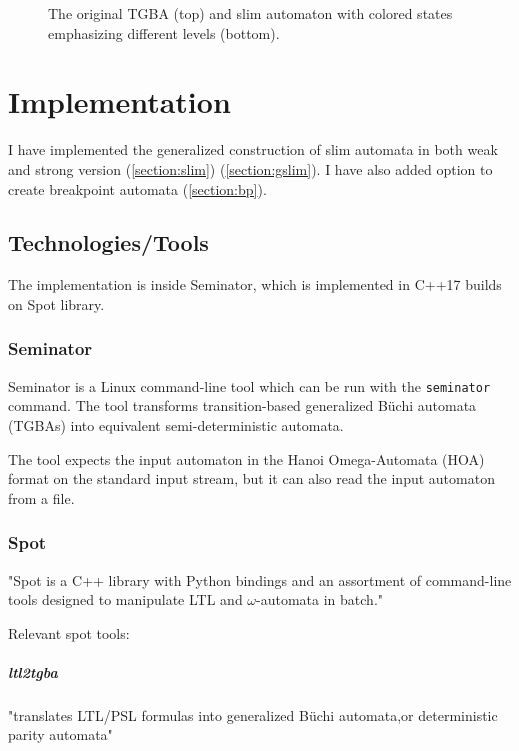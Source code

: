 \documentclass[
	digital,
nolof, nolot
]{fithesis3}
\begin{document}
						
			\begin{figure}[ht]
				\begin{center}
					
					
				\end{center}
				\caption{The original TGBA (top) and slim automaton with colored states emphasizing different levels (bottom).  }
				\label{fig:slim:gg}
			\end{figure}
			

			
	\chapter{Implementation} \label{implementation}
		I have implemented the generalized construction of slim automata in both weak and strong version  (\ref{section:slim}) (\ref{section:gslim}). I have also added option to create breakpoint automata (\ref{section:bp}).
		
		\section{Technologies/Tools}
		The implementation is inside Seminator, which is implemented in C++17 builds on Spot library. 
		\subsection{Seminator} 
		Seminator is a Linux command-line tool which can be run with the \texttt{seminator} command. The tool transforms transition-based generalized Büchi automata (TGBAs) into equivalent semi-deterministic automata. \cite{Klokočka2017thesis}\cite{seminator}\cite{seminator2}
		
		
		
		The tool expects the input automaton in the Hanoi Omega-Automata (HOA) format \cite{DBLP:conf/cav/BabiakBDKKM0S15} on the standard input stream, but it can also read the input automaton from a file.
		
	\subsection{Spot}
	"Spot is a C++ library with Python bindings and an assortment of command-line tools designed to manipulate LTL and $\omega$-automata in batch." \cite[Abstract]{spot}
	
	Relevant spot tools:
	\paragraph{ltl2tgba} "translates LTL/PSL formulas into generalized Büchi automata,or deterministic parity automata" \cite{spot}
\end{document}
